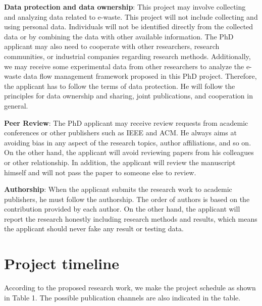 \documentclass{article}
\numberwithin{equation}{section}
\begin{document}
\textbf{Data protection and data ownership}: This project may involve collecting and analyzing data related to e-waste. This project will not include collecting and using personal data. Individuals will not be identified directly from the collected data or by combining the data with other available information. The PhD applicant may also need to cooperate with other researchers, research communities, or industrial companies regarding research methods. Additionally, we may receive some experimental data from other researchers to analyze the e-waste data flow management framework proposed in this PhD project. Therefore, the applicant has to follow the terms of data protection. He will follow the principles for data ownership and sharing, joint publications, and cooperation in general.

\textbf{Peer Review}: The PhD applicant may receive review requests from academic conferences or other publishers such as IEEE and ACM. He always aims at avoiding bias in any aspect of the research topics, author affiliations, and so on. On the other hand, the applicant will avoid reviewing papers from his colleagues or other relationship. In addition, the applicant will review the manuscript himself and will not pass the paper to someone else to review.

\textbf{Authorship}: When the applicant submits the research work to academic publishers, he must follow the authorship. The order of authors is based on the contribution provided by each author. On the other hand, the applicant will report the research honestly including research methods and results, which means the applicant should never fake any result or testing data.

\section{Project timeline}
According to the proposed research work, we make the project schedule as shown in Table 1. The possible publication channels are also indicated in the table. \\
\end{document}
